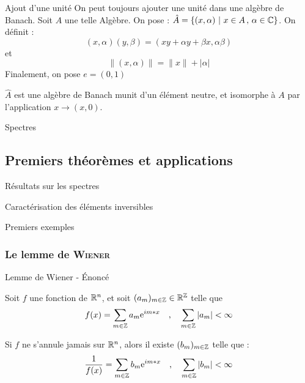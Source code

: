 \documentclass[12pt]{beamer}
\begin{document}
\begin{frame}{Ajout d'une unité}
    On peut toujours ajouter une unité dans une algèbre de Banach. Soit $A$ une telle Algèbre.
    On pose :
    $\hat{A} = \{ ( x, \alpha) \ | \ x \in A \, ,\, \alpha \in \mathbb{C} \}$. On définit :
    \[
        (x, \alpha) ( y, \beta) = (xy + \alpha y + \beta x, \alpha \beta )
        \]
    et 
    \[
        \| (x, \alpha) \| = \|x\| + |\alpha|
        \]
    Finalement, on pose $e = (0, 1)$
    \begin{myth}
        $\hat{A}$ est une algèbre de Banach munit d'un élément neutre, et isomorphe à $A$ par l'application $x \to (x, 0) $.
    \end{myth}
\end{frame}

\begin{frame}{Spectres}

\end{frame}

\subsection{Premiers théorèmes et applications}


\begin{frame}{Résultats sur les spectres}
\end{frame}
\begin{frame}{Caractérisation des éléments inversibles}
\end{frame}
\begin{frame}{Premiers exemples}

\end{frame}

\subsubsection{Le lemme de \textsc{Wiener}}

\begin{frame}{Lemme de Wiener - Énoncé}
    \begin{myth}
        Soit $f$ une fonction de $\mathbb{R}^n$, et soit $(a_m)_{m \in \mathbb{Z}} \in \mathbb{R}^{\mathbb{Z}} $ telle que 
        \[
            f(x) = \sum_{m\in \mathbb{Z} } a_m \textrm{e}^{im*x} \quad \text{,} \quad \sum_{m \in \mathbb{Z} } | a_m | < \infty 
        \]

        Si $f$ ne s'annule jamais sur $\mathbb{R}^n$, alors il existe $(b_m)_{m \in \mathbb{Z}} $ telle que :
        \[
            \frac{1}{f(x)} = \sum_{m \in \mathbb{Z}} b_m \textrm{e}^{im*x} \quad \text{,} \quad \sum_{m \in \mathbb{Z} } | b_m | < \infty 
        \]
    \end{myth}
\end{frame}
\end{document}
